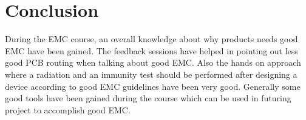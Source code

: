 \chapter{Conclusion}
During the EMC course, an overall knowledge about why products needs good EMC have been gained. The feedback sessions have helped in pointing out less good PCB routing when talking about good EMC. Also the hands on approach where a radiation and an immunity test should be performed after designing a device according to good EMC guidelines have been very good. 
\p Generally some good tools have been gained during the course which can be used in futuring project to accomplish good EMC.